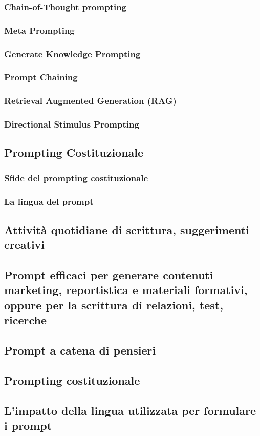         \subsubsection{Chain-of-Thought prompting}
        \subsubsection{Meta Prompting}
        \subsubsection{Generate Knowledge Prompting}
        \subsubsection{Prompt Chaining}
        \subsubsection{Retrieval Augmented Generation (RAG)}
        \subsubsection{Directional Stimulus Prompting}
    \subsection{Prompting Costituzionale}
        \subsubsection{Sfide del prompting costituzionale}
        \subsubsection{La lingua del prompt}
    \subsection{Attività quotidiane di scrittura, suggerimenti creativi}
    \subsection{Prompt efficaci per generare contenuti marketing, reportistica e materiali formativi, oppure per la scrittura di relazioni, test, ricerche}
    \subsection{Prompt a catena di pensieri}
    \subsection{Prompting costituzionale}
    \subsection{L'impatto della lingua utilizzata per formulare i prompt }
